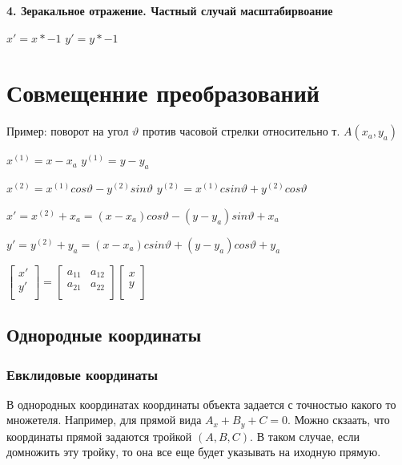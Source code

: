 \documentclass{article}
\begin{document}
\textbf{4. Зеракальное отражение. Частный случай масштабирвоание}

$x' = x*-1$ \hspace{5mm} $y' = y*-1$




\section{Совмещенние преобразований}

Пример: поворот на угол $\vartheta$ против часовой стрелки относительно т. $A(x_a, y_a)$

$x^{(1)}=x-x_a$ \hspace{5mm} $y^{(1)}=y-y_a$ 

$x^{(2)}=x^{(1)} cos \vartheta - y^{(2)} sin \vartheta $ \hspace{5mm}
$y^{(2)}=x^{(1)} csin \vartheta + y^{(2)} cos \vartheta $

\vspace{2mm}

$x' = x^{(2)}+x_a = (x-x_a) cos \vartheta - (y-y_a) sin \vartheta +x_a$

$y' = y^{(2)}+y_a = (x-x_a) csin \vartheta + (y-y_a) cos \vartheta +y_a$


\vspace{5mm}

$\begin{bmatrix}
    x' \\
    y' \\ 
\end{bmatrix}
=
\begin{bmatrix}
    a_{11} & a_{12}  \\[0.3em]
    a_{21} & a_{22}  \\[0.3em]
\end{bmatrix}
\begin{bmatrix}
    x \\
    y \\
\end{bmatrix}$

\subsection{Однородные координаты}
    \subsubsection{Евклидовые координаты}

    В однородных координатах координаты объекта задается с точностью какого то множетеля. Например,
    для прямой вида $A_x + B_y + C = 0$. Можно скзаать, что координаты прямой задаются тройкой $(A,B,C)$.
    В таком случае, если домножить эту тройку, то она все еще будет указывать на иходную прямую.
\end{document}
